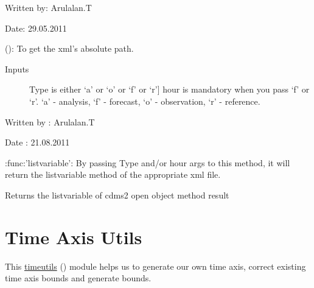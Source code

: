 \documentclass[letterpaper,10pt,english]{sphinxmanual}
\begin{document}
\begin{fulllineitems}
\begin{fulllineitems}
Written by: Arulalan.T

Date: 29.05.2011

\end{fulllineitems}


\begin{fulllineitems}
\label{diagnosisutils:xml_data_access.GribXmlAccess.getXmlPath}
{\hyperref[diagnosisutils:xml_data_access.GribXmlAccess.getXmlPath]{}} (): To get the xml's absolute path.
\begin{description}
\item[{Inputs}] \leavevmode{[}Type is either `a' or `o' or `f' or `r'{]}
hour is mandatory when you pass `f' or `r'.
`a' - analysis, `f' - forecast,
`o' - observation, `r' - reference.

\end{description}

Written by : Arulalan.T

Date : 21.08.2011

\end{fulllineitems}


\begin{fulllineitems}
\label{diagnosisutils:xml_data_access.GribXmlAccess.listvariable}
:func:'listvariable': By passing Type and/or hour args to this method,
it will return the listvariable method of the appropriate xml file.

Returns the listvariable of cdms2 open object method result

\end{fulllineitems}


\end{fulllineitems}



\section{Time Axis Utils}
\label{diagnosisutils:time-axis-utils}
This {\hyperref[diagnosisutils:timeutils]{timeutils}} () module helps us to generate our own time axis, correct existing time axis bounds and generate bounds.
\end{document}
